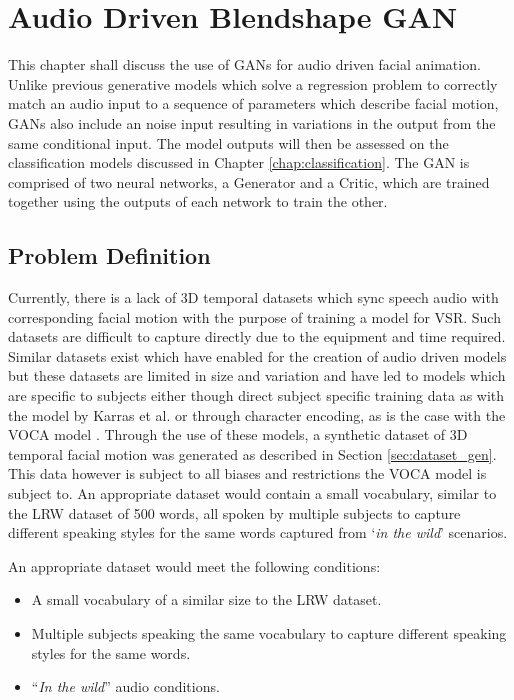 


\chapter{Audio Driven Blendshape GAN} \label{chap:generation}
This chapter shall discuss the use of GANs for audio driven facial animation.
Unlike previous generative models which solve a regression problem to correctly match an audio input to a sequence of parameters which describe facial motion, GANs also include an noise input resulting in variations in the output from the same conditional input.
The model outputs will then be assessed on the classification models discussed in Chapter \ref{chap:classification}.
The GAN is comprised of two neural networks, a Generator and a Critic, which are trained together using the outputs of each network to train the other.

\section{Problem Definition}
Currently, there is a lack of 3D temporal datasets which sync speech audio with corresponding facial motion with the purpose of training a model for VSR.
Such datasets are difficult to capture directly due to the equipment and time required.
Similar datasets exist which have enabled for the creation of audio driven models but these datasets are limited in size and variation and have led to models which are specific to subjects either though direct subject specific training data as with the model by Karras et al. \cite{Karras2017a} or through character encoding, as is the case with the VOCA model \cite{Cudeiro2019}.
Through the use of these models, a synthetic dataset of 3D temporal facial motion was generated as described in Section \ref{sec:dataset_gen}.
This data however is subject to all biases and restrictions the VOCA model is subject to.
An appropriate dataset would contain a small vocabulary, similar to the LRW dataset of 500 words, all spoken by multiple subjects to capture different speaking styles for the same words captured from `\textit{in the wild}' scenarios.

An appropriate dataset would meet the following conditions:
\begin{itemize}
    \item A small vocabulary of a similar size to the LRW dataset.
    \item Multiple subjects speaking the same vocabulary to capture different speaking styles for the same words.
    \item ``\textit{In the wild}'' audio conditions.
\end{itemize}

